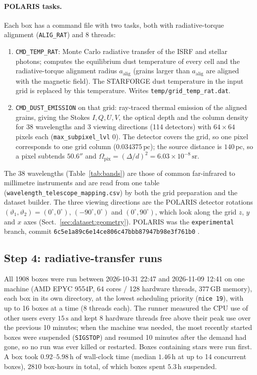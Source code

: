 \paragraph{POLARIS tasks.} Each box has a command file with two tasks, both with radiative-torque alignment
(\texttt{ALIG\_RAT}) and 8 threads:
\begin{enumerate}
  \item \texttt{CMD\_TEMP\_RAT}: Monte Carlo radiative transfer of the ISRF and stellar photons; computes the
  equilibrium dust temperature of every cell and the radiative-torque alignment radius $a_\mathrm{alig}$ (grains
  larger than $a_\mathrm{alig}$ are aligned with the magnetic field). The STARFORGE dust temperature in the input
  grid is replaced by this temperature. Writes \texttt{temp/grid\_temp\_rat.dat}.
  \item \texttt{CMD\_DUST\_EMISSION} on that grid: ray-traced thermal emission of the aligned grains, giving the
  Stokes $I,Q,U,V$, the optical depth and the column density for 38 wavelengths and 3 viewing directions
  (114 detectors) with $64\times64$ pixels each (\texttt{max\_subpixel\_lvl} 0). The detector covers the grid, so
  one pixel corresponds to one grid column ($0.034375\,\mathrm{pc}$); the source distance is
  $140\,\mathrm{pc}$, so a pixel subtends $50.6''$ and
  $\Omega_\mathrm{pix}=(\Delta/d)^{2}=6.03\times10^{-8}\,\mathrm{sr}$.
\end{enumerate}
The 38 wavelengths (Table~\ref{tab:bands}) are those of common far-infrared to millimetre instruments and are
read from one table (\texttt{wavelength\_telescope\_mapping.csv}) by both the grid preparation and the dataset
builder. The three viewing directions are the POLARIS detector rotations
$(\vartheta_1,\vartheta_2)=(0^\circ,0^\circ)$, $(-90^\circ,0^\circ)$ and $(0^\circ,90^\circ)$, which look along the
grid $z$, $y$ and $x$ axes (Sect.~\ref{sec:dataset:geometry}). POLARIS was the \texttt{experimental} branch,
commit \texttt{6c5e1a89c6e14ce806c47bbb87947b98e3f761b0} \citep{Reissl2016}.

\subsection{Step 4: radiative-transfer runs}
\label{sec:dataset:runs}

All 1908 boxes were run between 2026-10-31 22:47 and 2026-11-09 12:41 on one machine (AMD EPYC 9554P, 64 cores
/ 128 hardware threads, $377\,\mathrm{GB}$ memory), each box in its own directory, at the lowest scheduling
priority (\texttt{nice 19}), with up to 16 boxes at a time (8 threads each). The runner measured the CPU use of
other users every $15\,\mathrm{s}$ and kept 8 hardware threads free above their peak use over the previous
10 minutes; when the machine was needed, the most recently started boxes were suspended (\texttt{SIGSTOP}) and
resumed 10 minutes after the demand had gone, so no run was ever killed or restarted. Boxes containing stars
were run first. A box took $0.92$--$5.98\,\mathrm{h}$ of wall-clock time (median $1.46\,\mathrm{h}$ at up to 14
concurrent boxes), $2810$ box-hours in total, of which boxes spent $5.3\,\mathrm{h}$ suspended.

